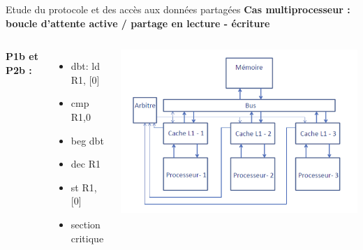 \documentclass{beamer}
\begin{document}
\begin{frame}{Etude du protocole et des accès aux données partagées}
    \textbf{Cas multiprocesseur : boucle d’attente active / partage en lecture - \hspace*{3.8cm} écriture}
    \begin{columns}[c] %

        \textbf{P1b et P2b : }
        \begin{itemize}
            \item dbt: ld R1, [0]
	    \item 	cmp R1,0
	    \item	beg dbt	 
	    \item	dec R1
	    \item	st R1, [0]
	    \item	section critique
        \end{itemize}

        \vspace{1cm}
        \includegraphics[scale=0.3]{archi.png}
        
    \end{columns}
\end{frame}
\end{document}
